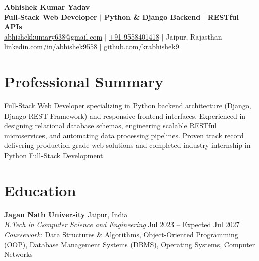 \documentclass[a4paper,9pt]{extarticle}
\begin{document}
\begin{center}
    {\Huge \textbf{Abhishek Kumar Yadav}} \\ \vspace{2pt}
    {\normalsize \textbf{Full-Stack Web Developer $\mid$ Python \& Django Backend $\mid$ RESTful APIs}} \\ \vspace{2pt}
    \small
    \href{mailto:abhishekkumary638@gmail.com}{abhishekkumary638@gmail.com} $|$
    \href{tel:+919558401418}{+91-9558401418} $|$
    Jaipur, Rajasthan \\
    \href{https://www.linkedin.com/in/abhishek9558}{linkedin.com/in/abhishek9558} $|$
    \href{https://github.com/krabhishek9}{github.com/krabhishek9}
\end{center}

\vspace{-6pt}

\section{Professional Summary}
Full-Stack Web Developer specializing in Python backend architecture (Django, Django REST Framework) and responsive frontend interfaces. Experienced in designing relational database schemas, engineering scalable RESTful microservices, and automating data processing pipelines. Proven track record delivering production-grade web solutions and completed industry internship in Python Full-Stack Development.

\vspace{-3pt}

\section{Education}
\textbf{Jagan Nath University} \hfill Jaipur, India \\
\textit{B.Tech in Computer Science and Engineering} \hfill Jul 2023 -- Expected Jul 2027 \\
\textit{Coursework:} Data Structures \& Algorithms, Object-Oriented Programming (OOP), Database Management Systems (DBMS), Operating Systems, Computer Networks

\vspace{-3pt}

\end{document}
